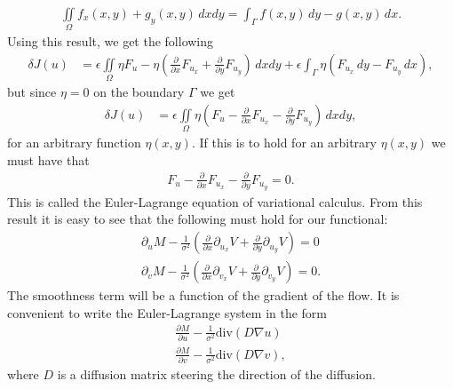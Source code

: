\documentclass[10pt,a4paper]{article}
\begin{document}
\begin{align*}
\iint \limits_\Omega f_x(x,y) + g_y(x,y) \, dx dy = \int_\Gamma f(x,y) \, dy - g(x,y) \, dx. 
\end{align*}
Using this result, we get the following
\begin{align*}
\delta J(u) &= \epsilon \iint \limits_{\Omega} \eta F_u - \eta \left( \frac{\partial}{\partial x} F_{u_x} + \frac{\partial }{\partial y} F_{u_y} \right) \, dxdy + \epsilon \int_\Gamma \eta (F_{u_x} \, dy - F_{u_y} \, dx),
\end{align*}
but since $\eta = 0$ on the boundary $\Gamma$ we get
\begin{align*}
\delta J(u) &= \epsilon \iint \limits_{\Omega} \eta \left( F_u - \frac{\partial}{\partial x} F_{u_x} - \frac{\partial }{\partial y} F_{u_y} \right) \, dxdy,
\end{align*}
for an arbitrary function $\eta(x,y)$. If this is to hold for an arbitrary $\eta(x,y)$ we must have that 
\begin{align*}
F_u - \frac{\partial}{\partial x} F_{u_x} - \frac{\partial }{\partial y} F_{u_y} = 0.
\end{align*}
This is called the Euler-Lagrange equation of variational calculus. From this result it is easy to see that the following must hold for our functional:
\begin{equation}
\label{EL}
  \begin{aligned}
\partial_u M - \frac{1}{\sigma^2}(\frac{\partial}{\partial x} \partial_{u_x} V + \frac{\partial}{\partial y} \partial_{u_y} V) = 0 \\
\partial_v M- \frac{1}{\sigma^2}(\frac{\partial}{\partial x} \partial_{v_x} V + \frac{\partial}{\partial y} \partial_{v_y} V) = 0.
  \end{aligned}
\end{equation}
The smoothness term will be a function of the gradient of the flow. It is convenient to write the Euler-Lagrange system in the form
\begin{equation}
\label{EL_regu}
  \begin{aligned}
\frac{\partial M}{\partial u} - \frac{1}{\sigma^2} \text{div}(D \nabla u) \\
\frac{\partial M}{\partial v} - \frac{1}{\sigma^2} \text{div}(D \nabla v),
  \end{aligned}
\end{equation}
where $D$ is a diffusion matrix steering the direction of the diffusion.
\end{document}
